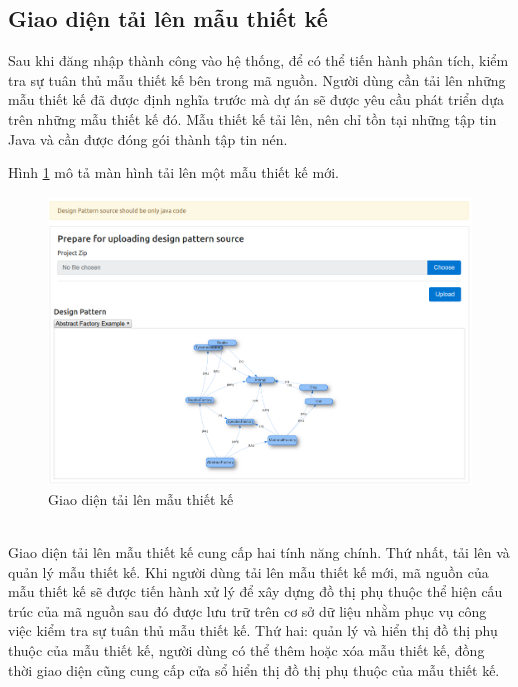 \documentclass[12pt]{report}
\begin{document}
\subsection{Giao diện tải lên mẫu thiết kế}
Sau khi đăng nhập thành công vào hệ thống, để có thể tiến hành phân tích, kiểm tra sự tuân thủ mẫu thiết kế bên trong mã nguồn. Người dùng cần tải lên những mẫu thiết kế đã được định nghĩa trước mà dự án sẽ được yêu cầu phát triển dựa trên những mẫu thiết kế đó. Mẫu thiết kế tải lên, nên chỉ tồn tại những tập tin Java và cần được đóng gói thành tập tin nén.
 
\noindent Hình \ref{fig:ds_upload_example} mô tả màn hình tải lên một mẫu thiết kế mới.
\begin{figure}[h]
	\centering
	\includegraphics[scale=0.4]{images/ds_upload_example}
	\caption{Giao diện tải lên mẫu thiết kế}
	\label{fig:ds_upload_example}
\end{figure}\\
Giao diện tải lên mẫu thiết kế cung cấp hai tính năng chính. Thứ nhất, tải lên và quản lý mẫu thiết kế. Khi người dùng tải lên mẫu thiết kế mới, mã nguồn của mẫu thiết kế sẽ được tiến hành xử lý để xây dựng đồ thị phụ thuộc thể hiện cấu trúc của mã nguồn sau đó được lưu trữ trên cơ sở dữ liệu nhằm phục vụ công việc kiểm tra sự tuân thủ mẫu thiết kế. Thứ hai: quản lý và hiển thị đồ thị phụ thuộc của mẫu thiết kế, người dùng có thể thêm hoặc xóa mẫu thiết kế, đồng thời giao diện cũng cung cấp cửa sổ hiển thị đồ thị phụ thuộc của mẫu thiết kế.
\end{document}

